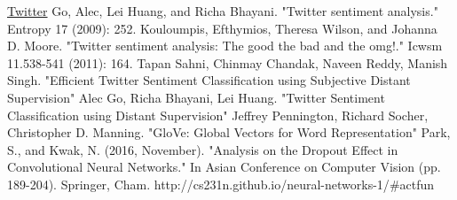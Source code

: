 \documentclass[10pt,conference,compsocconf]{IEEEtran}
\begin{document}
\begin{thebibliography}{99}

	 \href{http://twitter.com}{Twitter}
	 Go, Alec, Lei Huang, and Richa Bhayani. "Twitter sentiment analysis." Entropy 17 (2009): 252.
	 Kouloumpis, Efthymios, Theresa Wilson, and Johanna D. Moore. "Twitter sentiment analysis: The good the bad and the omg!." Icwsm 11.538-541 (2011): 164.
	 Tapan Sahni, Chinmay Chandak, Naveen Reddy, Manish Singh. "Efficient Twitter Sentiment Classification using Subjective Distant Supervision"
	 Alec Go, Richa Bhayani,	Lei Huang. "Twitter Sentiment Classification using Distant Supervision"
	 Jeffrey Pennington, Richard Socher, Christopher D. Manning. "GloVe: Global Vectors for Word Representation"
	 Park, S., and Kwak, N. (2016, November). "Analysis on the Dropout Effect in Convolutional Neural Networks." In Asian Conference on Computer Vision (pp. 189-204). Springer, Cham.
	 http://cs231n.github.io/neural-networks-1/{\#}actfun
\end{thebibliography}
\end{document}
